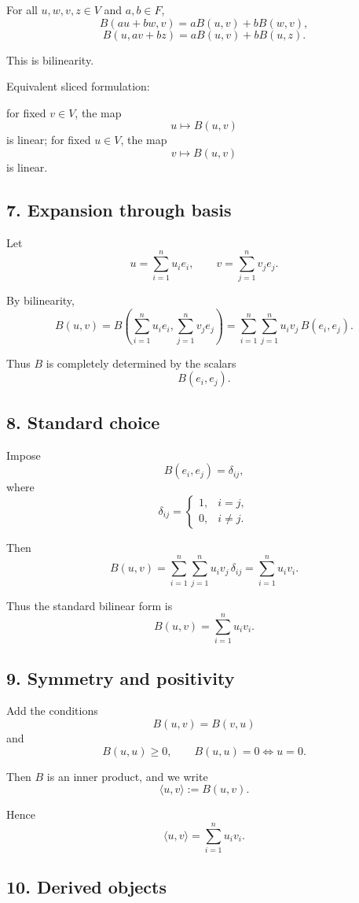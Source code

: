 \documentclass{article}
\begin{document}
	For all $u,w,v,z\in V$ and $a,b\in F$,
	$$
	B(au+bw,v)=aB(u,v)+bB(w,v),
	$$
	$$
	B(u,av+bz)=aB(u,v)+bB(u,z).
	$$
	
	This is bilinearity.
	
	Equivalent sliced formulation:
	
	for fixed $v\in V$, the map
	$$
	u\mapsto B(u,v)
	$$
	is linear; for fixed $u\in V$, the map
	$$
	v\mapsto B(u,v)
	$$
	is linear.
	
	\subsection*{7. Expansion through basis}
	
	Let
	$$
	u=\sum_{i=1}^n u_i e_i,
	\qquad
	v=\sum_{j=1}^n v_j e_j.
	$$
	
	By bilinearity,
	$$
	B(u,v)
	=
	B\!\left(\sum_{i=1}^n u_i e_i,\sum_{j=1}^n v_j e_j\right)
	=
	\sum_{i=1}^n\sum_{j=1}^n u_i v_j\, B(e_i,e_j).
	$$
	
	Thus $B$ is completely determined by the scalars
	$$
	B(e_i,e_j).
	$$
	
	\subsection*{8. Standard choice}
	
	Impose
	$$
	B(e_i,e_j)=\delta_{ij},
	$$
	where
	$$
	\delta_{ij}=
	\begin{cases}
		1,& i=j,\\
		0,& i\neq j.
	\end{cases}
	$$
	
	Then
	$$
	B(u,v)
	=
	\sum_{i=1}^n\sum_{j=1}^n u_i v_j\,\delta_{ij}
	=
	\sum_{i=1}^n u_i v_i.
	$$
	
	Thus the standard bilinear form is
	$$
	B(u,v)=\sum_{i=1}^n u_i v_i.
	$$
	
	\subsection*{9. Symmetry and positivity}
	
	Add the conditions
	$$
	B(u,v)=B(v,u)
	$$
	and
	$$
	B(u,u)\ge 0,
	\qquad
	B(u,u)=0 \iff u=0.
	$$
	
	Then $B$ is an inner product, and we write
	$$
	\langle u,v\rangle := B(u,v).
	$$
	
	Hence
	$$
	\langle u,v\rangle=\sum_{i=1}^n u_i v_i.
	$$
	
	\subsection*{10. Derived objects}
	
\end{document}
